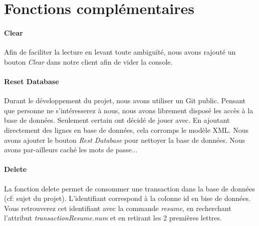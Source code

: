 \documentclass{article}
\begin{document}
  \newpage
  \section{Fonctions complémentaires}
    \paragraph{Clear}
      Afin de faciliter la lecture en levant toute ambiguïté, nous avons rajouté un bouton \emph{Clear} dans
      notre client afin de vider la console.
    \paragraph{Reset Database}
      Durant le développement du projet, nous avons utiliser un Git public. Pensant que personne ne s'intéresserez à nous,
      nous avons librement disposé les accès à la base de données. Seulement certain ont décidé de jouer avec. 
      En ajoutant directement des lignes en base de données, cela corromps le modèle XML. Nous avons ajouter le bouton
      \emph{Rest Database} pour nettoyer la base de données. Nous avons par-ailleurs caché les mots de passe...
    \paragraph{Delete}
      La fonction delete permet de consommer une transaction dans la base de données (cf: sujet du projet).
      L'identifiant correspond à la colonne id en bise de données. Vous retrouverez cet identifiant avec la commande \emph{resume},
      en recherchant l'attribut \emph{transactionResume.num} et en retirant les 2 premières lettres.
\end{document}
